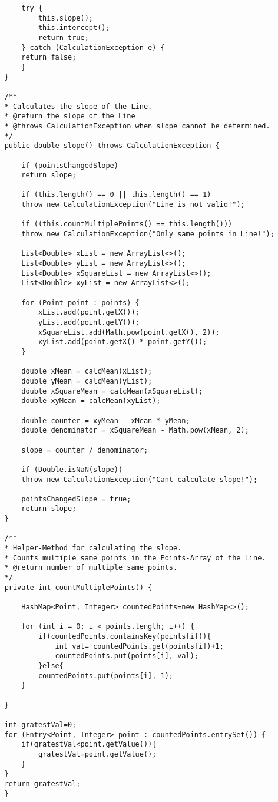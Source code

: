 \begin{lstlisting}
		try {
			this.slope();
			this.intercept();
			return true;
		} catch (CalculationException e) {
		return false;
		}
	}

	/**
	* Calculates the slope of the Line.
	* @return the slope of the Line
	* @throws CalculationException when slope cannot be determined.
	*/
	public double slope() throws CalculationException {
		
		if (pointsChangedSlope)
		return slope;
		
		if (this.length() == 0 || this.length() == 1)
		throw new CalculationException("Line is not valid!");
		
		if ((this.countMultiplePoints() == this.length()))
		throw new CalculationException("Only same points in Line!");
		
		List<Double> xList = new ArrayList<>();
		List<Double> yList = new ArrayList<>();
		List<Double> xSquareList = new ArrayList<>();
		List<Double> xyList = new ArrayList<>();
		
		for (Point point : points) {
			xList.add(point.getX());
			yList.add(point.getY());
			xSquareList.add(Math.pow(point.getX(), 2));
			xyList.add(point.getX() * point.getY());
		}
		
		double xMean = calcMean(xList);
		double yMean = calcMean(yList);
		double xSquareMean = calcMean(xSquareList);
		double xyMean = calcMean(xyList);
		
		double counter = xyMean - xMean * yMean;
		double denominator = xSquareMean - Math.pow(xMean, 2);
		
		slope = counter / denominator;
		
		if (Double.isNaN(slope))
		throw new CalculationException("Cant calculate slope!");
		
		pointsChangedSlope = true;
		return slope;
	}
	
	/**
	* Helper-Method for calculating the slope.
	* Counts multiple same points in the Points-Array of the Line.
	* @return number of multiple same points.
	*/
	private int countMultiplePoints() {
		
		HashMap<Point, Integer> countedPoints=new HashMap<>();
		
		for (int i = 0; i < points.length; i++) {
			if(countedPoints.containsKey(points[i])){
				int val= countedPoints.get(points[i])+1;
				countedPoints.put(points[i], val);
			}else{
			countedPoints.put(points[i], 1);
		}
		
	}
	
	int gratestVal=0;
	for (Entry<Point, Integer> point : countedPoints.entrySet()) {
		if(gratestVal<point.getValue()){
			gratestVal=point.getValue();
		}
	}
	return gratestVal;
	}
	

\end{lstlisting}
